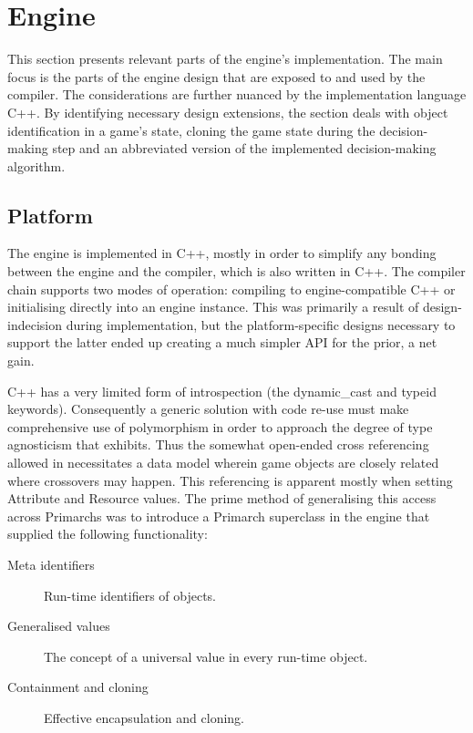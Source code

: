 \section{Engine}
This section presents relevant parts of the engine's implementation. The main focus is the parts of the engine design that are exposed to and used by the compiler. The considerations are further nuanced by the implementation language C++. By identifying necessary design extensions, the section deals with object identification in a game's state, cloning the game state during the decision-making step and an abbreviated version of the implemented decision-making algorithm.

\subsection{Platform}
The engine is implemented in C++, %
mostly in order to simplify any bonding between the engine and the compiler, which is also written in C++. The compiler chain supports two modes of operation: compiling to engine-compatible C++ or initialising directly into an engine instance. This was primarily a result of design-indecision during implementation, but the platform-specific designs necessary to support the latter ended up creating a much simpler API for the prior, a net gain.

C++ has a very limited form of introspection (the dynamic\_cast and typeid keywords). Consequently a generic solution with code re-use must make comprehensive use of polymorphism in order to approach the degree of type agnosticism that \langname{} exhibits. Thus the somewhat open-ended cross referencing allowed in \langname{} necessitates a data model wherein game objects are closely related where crossovers may happen. This referencing is apparent mostly when setting Attribute and Resource values. The prime method of generalising this access across Primarchs was to introduce a Primarch superclass in the engine that supplied the following functionality:
\begin{description}
	\item[Meta identifiers] Run-time identifiers of objects.
	\item[Generalised values] The concept of a universal value in every run-time object.
	\item[Containment and cloning] Effective encapsulation and cloning.
\end{description}

